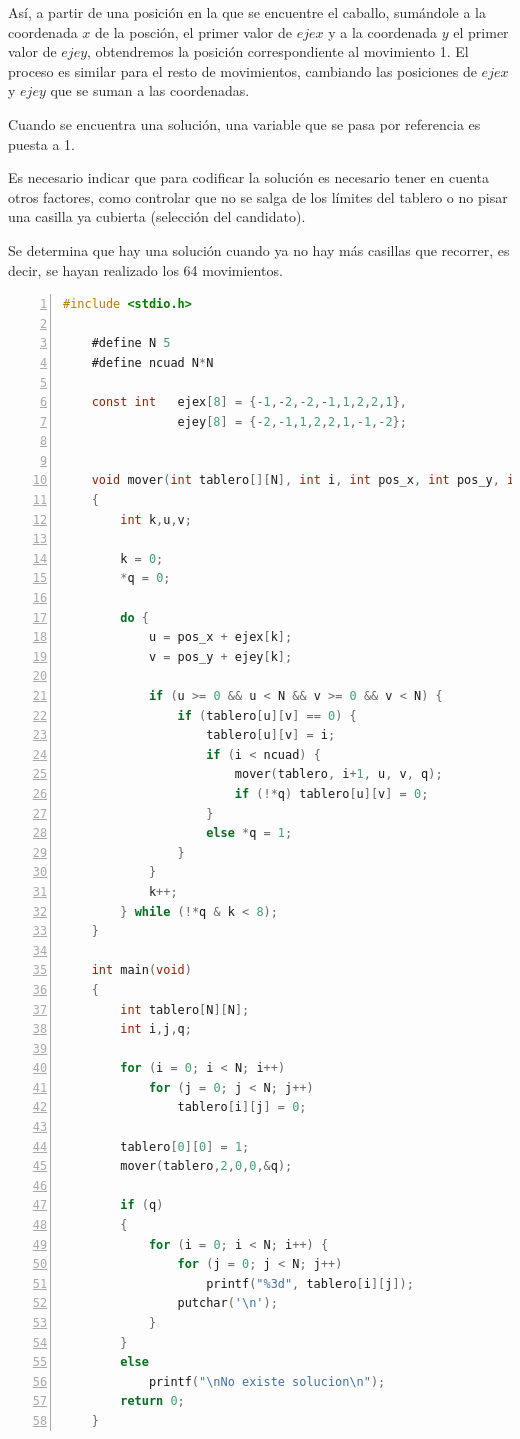 \documentclass[a4paper, 11pt, titlepage]{article}
\begin{document}
                    Así, a partir de una posición en la que se encuentre el caballo, sumándole a la 
                    coordenada $x$ de la posción, el primer valor de $ejex$ y a la coordenada $y$ el 
                    primer valor de $ejey$, obtendremos la posición correspondiente al movimiento 1.
                    El proceso es similar para el resto de movimientos, cambiando las posiciones de 
                    $ejex$ y $ejey$ que se suman a las coordenadas.

                    Cuando se encuentra una solución, una variable que se pasa por referencia es puesta 
                    a 1.

                    Es necesario indicar que para codificar la solución es necesario tener en cuenta 
                    otros factores, como controlar que no se salga de los límites del tablero o no 
                    pisar una casilla ya cubierta (selección del candidato).

                    Se determina que hay una solución cuando ya no hay más casillas que recorrer, es 
                    decir, se hayan realizado los 64 movimientos.

                    
                    \begin{lstlisting}[language=C,numbers=left,basicstyle=\small]
    #include <stdio.h>

    #define N 5
    #define ncuad N*N
    
    const int   ejex[8] = {-1,-2,-2,-1,1,2,2,1},
                ejey[8] = {-2,-1,1,2,2,1,-1,-2};
    
    
    void mover(int tablero[][N], int i, int pos_x, int pos_y, int *q)
    {
        int k,u,v;
    
        k = 0;
        *q = 0;
    
        do {
            u = pos_x + ejex[k];
            v = pos_y + ejey[k];
    
            if (u >= 0 && u < N && v >= 0 && v < N) {
                if (tablero[u][v] == 0) {
                    tablero[u][v] = i;
                    if (i < ncuad) {
                        mover(tablero, i+1, u, v, q);
                        if (!*q) tablero[u][v] = 0; 
                    }
                    else *q = 1;
                }
            }
            k++;
        } while (!*q & k < 8);
    }
    
    int main(void)
    {
        int tablero[N][N];
        int i,j,q;
    
        for (i = 0; i < N; i++)
            for (j = 0; j < N; j++)
                tablero[i][j] = 0;
    
        tablero[0][0] = 1;
        mover(tablero,2,0,0,&q);
    
        if (q)
        {
            for (i = 0; i < N; i++) {
                for (j = 0; j < N; j++)
                    printf("%3d", tablero[i][j]);
                putchar('\n');
            }
        }
        else 
            printf("\nNo existe solucion\n");
        return 0;
    }\end{lstlisting}
                    
\end{document}
